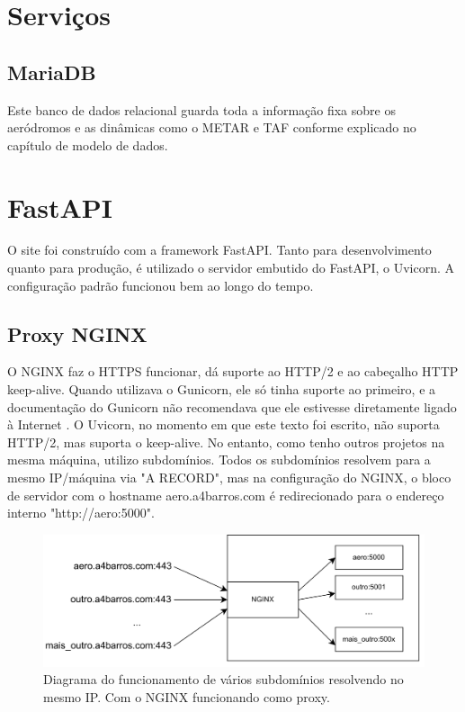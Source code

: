 \section{Serviços}

\subsection{MariaDB}
Este banco de dados relacional guarda toda a informação fixa sobre os aeródromos e as dinâmicas
como o METAR e TAF conforme explicado no capítulo de modelo de dados.

\section{FastAPI}

O site foi construído com a framework FastAPI. Tanto para desenvolvimento quanto para produção, 
é utilizado o servidor embutido do FastAPI, o Uvicorn. A configuração padrão funcionou bem ao
longo do tempo.

\subsection{Proxy NGINX}
O NGINX faz o HTTPS funcionar, dá suporte ao HTTP/2 e ao cabeçalho HTTP keep-alive. Quando
utilizava o Gunicorn, ele só tinha suporte ao primeiro, e a documentação do Gunicorn não
recomendava que ele estivesse diretamente ligado à Internet \cite{nginx-gunicorn}. O Uvicorn,
no momento em que este texto foi escrito, não suporta HTTP/2, mas suporta o keep-alive. No
entanto, como tenho outros projetos na mesma máquina, utilizo subdomínios. Todos os subdomínios
resolvem para a mesmo IP/máquina via "A RECORD", mas na configuração
do NGINX, o bloco de servidor com o hostname aero.a4barros.com é redirecionado para o
endereço interno "http://aero:5000".


\begin{figure}[ht]
    \begin{center}
    \includegraphics[width=400pt]{img/arquit.png}
    \caption{Diagrama do funcionamento de vários subdomínios resolvendo no mesmo IP. Com o NGINX funcionando como proxy.}
    \label{fig:sbrf-plot}
    \end{center}
\end{figure}

